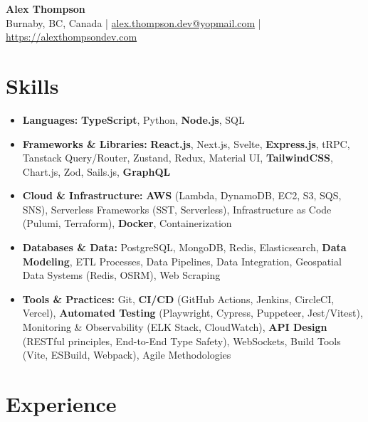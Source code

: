 \documentclass[10pt]{article}
\begin{document}
\begin{center}
    \textbf{\Large Alex Thompson} \\
    Burnaby, BC, Canada | \href{mailto:alex.thompson.dev@yopmail.com}{alex.thompson.dev@yopmail.com} | \href{https://alexthompsondev.com}{https://alexthompsondev.com}
\end{center}

\section*{Skills}
\begin{itemize}[label={}] %
    \item \textbf{Languages:} \textbf{TypeScript}, Python, \textbf{Node.js}, SQL
    \item \textbf{Frameworks \& Libraries:} \textbf{React.js}, Next.js, Svelte, \textbf{Express.js}, tRPC, Tanstack Query/Router,
      Zustand, Redux, Material UI, \textbf{TailwindCSS}, Chart.js, Zod, Sails.js, \textbf{GraphQL}
    \item \textbf{Cloud \& Infrastructure:} \textbf{AWS} (Lambda, DynamoDB, EC2, S3, SQS, SNS), Serverless Frameworks
      (SST, Serverless), Infrastructure as Code (Pulumi, Terraform), \textbf{Docker}, Containerization
    \item \textbf{Databases \& Data:} PostgreSQL, MongoDB, Redis, Elasticsearch, \textbf{Data Modeling}, ETL Processes,
      Data Pipelines, Data Integration, Geospatial Data Systems (Redis, OSRM), Web Scraping
    \item \textbf{Tools \& Practices:} Git, \textbf{CI/CD} (GitHub Actions, Jenkins, CircleCI, Vercel), \textbf{Automated Testing}
      (Playwright, Cypress, Puppeteer, Jest/Vitest), Monitoring \& Observability (ELK Stack,
      CloudWatch), \textbf{API Design} (RESTful principles, End-to-End Type Safety), WebSockets, Build Tools
      (Vite, ESBuild, Webpack), Agile Methodologies
\end{itemize}

\section*{Experience}
\end{document}

